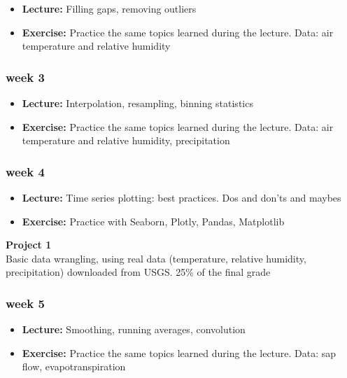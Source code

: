 \documentclass[
  letterpaper,
  DIV=11,
  numbers=noendperiod,
  oneside]{scrreprt}
\providecommand{\tightlist}{%
  \setlength{\itemsep}{0pt}\setlength{\parskip}{0pt}}\usepackage{longtable,booktabs,array}
\begin{document}
\begin{itemize}
\tightlist
\item
  \textbf{Lecture:} Filling gaps, removing outliers
\item
  \textbf{Exercise:} Practice the same topics learned during the
  lecture. Data: air temperature and relative humidity
\end{itemize}

\hypertarget{week-3}{%
\subsubsection*{week 3}\label{week-3}}

\begin{itemize}
\tightlist
\item
  \textbf{Lecture:} Interpolation, resampling, binning statistics
\item
  \textbf{Exercise:} Practice the same topics learned during the
  lecture. Data: air temperature and relative humidity, precipitation
\end{itemize}

\hypertarget{week-4}{%
\subsubsection*{week 4}\label{week-4}}

\begin{itemize}
\tightlist
\item
  \textbf{Lecture:} Time series plotting: best practices. Dos and don'ts
  and maybes
\item
  \textbf{Exercise:} Practice with Seaborn, Plotly, Pandas, Matplotlib
\end{itemize}

\textbf{Project 1}\\
Basic data wrangling, using real data (temperature, relative humidity,
precipitation) downloaded from USGS. 25\% of the final grade

\hypertarget{week-5}{%
\subsubsection*{week 5}\label{week-5}}

\begin{itemize}
\tightlist
\item
  \textbf{Lecture:} Smoothing, running averages, convolution
\item
  \textbf{Exercise:} Practice the same topics learned during the
  lecture. Data: sap flow, evapotranspiration
\end{itemize}
\end{document}
